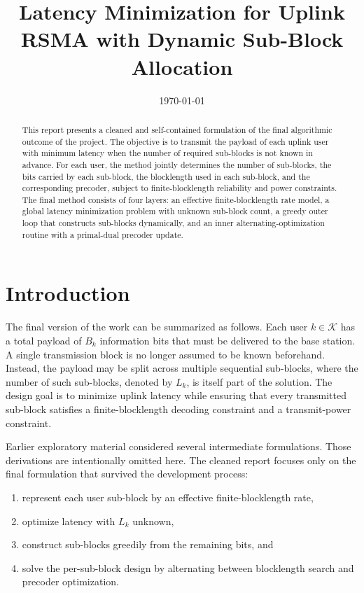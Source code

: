 \documentclass[11pt]{article}
\title{Latency Minimization for Uplink RSMA with Dynamic Sub-Block Allocation}
\author{}
\date{\today}
\newcommand{\Kset}{\mathcal{K}}
\begin{document}
\maketitle

\begin{abstract}
This report presents a cleaned and self-contained formulation of the final algorithmic outcome of the project. The objective is to transmit the payload of each uplink user with minimum latency when the number of required sub-blocks is not known in advance. For each user, the method jointly determines the number of sub-blocks, the bits carried by each sub-block, the blocklength used in each sub-block, and the corresponding precoder, subject to finite-blocklength reliability and power constraints. The final method consists of four layers: an effective finite-blocklength rate model, a global latency minimization problem with unknown sub-block count, a greedy outer loop that constructs sub-blocks dynamically, and an inner alternating-optimization routine with a primal-dual precoder update.
\end{abstract}

\section{Introduction}
The final version of the work can be summarized as follows. Each user $k \in \Kset$ has a total payload of $B_k$ information bits that must be delivered to the base station. A single transmission block is no longer assumed to be known beforehand. Instead, the payload may be split across multiple sequential sub-blocks, where the number of such sub-blocks, denoted by $L_k$, is itself part of the solution. The design goal is to minimize uplink latency while ensuring that every transmitted sub-block satisfies a finite-blocklength decoding constraint and a transmit-power constraint.

Earlier exploratory material considered several intermediate formulations. Those derivations are intentionally omitted here. The cleaned report focuses only on the final formulation that survived the development process:
\begin{enumerate}
    \item represent each user sub-block by an effective finite-blocklength rate,
    \item optimize latency with $L_k$ unknown,
    \item construct sub-blocks greedily from the remaining bits, and
    \item solve the per-sub-block design by alternating between blocklength search and precoder optimization.
\end{enumerate}
\end{document}
